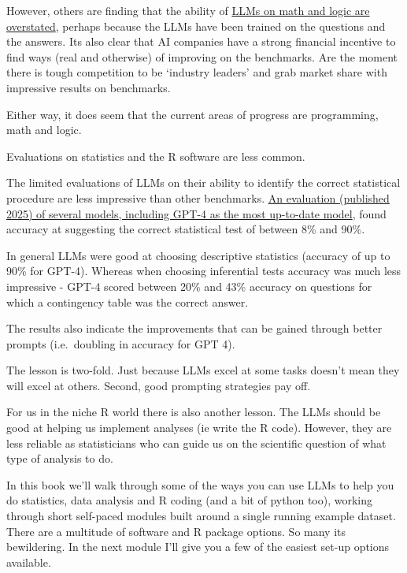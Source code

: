 \documentclass[
  letterpaper,
  DIV=11,
  numbers=noendperiod]{scrreprt}
\begin{document}
However, others are finding that the ability of
\href{https://garymarcus.substack.com/p/reports-of-llms-mastering-math-have}{LLMs
on math and logic are overstated}, perhaps because the LLMs have been
trained on the questions and the answers. Its also clear that AI
companies have a strong financial incentive to find ways (real and
otherwise) of improving on the benchmarks. Are the moment there is tough
competition to be `industry leaders' and grab market share with
impressive results on benchmarks.

Either way, it does seem that the current areas of progress are
programming, math and logic.

Evaluations on statistics and the R software are less common.

The limited evaluations of LLMs on their ability to identify the correct
statistical procedure are less impressive than other benchmarks.
\href{https://arxiv.org/abs/2406.07815}{An evaluation (published 2025)
of several models, including GPT-4 as the most up-to-date model}, found
accuracy at suggesting the correct statistical test of between 8\% and
90\%.

In general LLMs were good at choosing descriptive statistics (accuracy
of up to 90\% for GPT-4). Whereas when choosing inferential tests
accuracy was much less impressive - GPT-4 scored between 20\% and 43\%
accuracy on questions for which a contingency table was the correct
answer.

The results also indicate the improvements that can be gained through
better prompts (i.e.~doubling in accuracy for GPT 4).

The lesson is two-fold. Just because LLMs excel at some tasks doesn't
mean they will excel at others. Second, good prompting strategies pay
off.

For us in the niche R world there is also another lesson. The LLMs
should be good at helping us implement analyses (ie write the R code).
However, they are less reliable as statisticians who can guide us on the
scientific question of what type of analysis to do.

In this book we'll walk through some of the ways you can use LLMs to
help you do statistics, data analysis and R coding (and a bit of python
too), working through short self-paced modules built around a single
running example dataset. There are a multitude of software and R package
options. So many its bewildering. In the next module I'll give you a few
of the easiest set-up options available.

\end{document}
